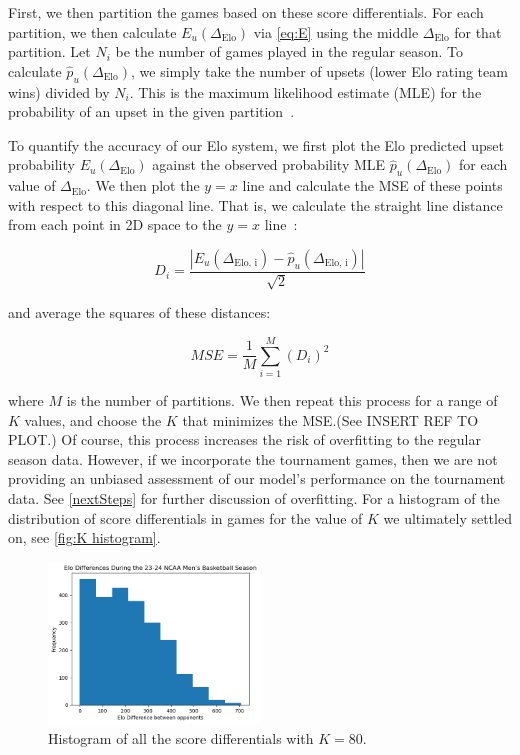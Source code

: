 \documentclass{article}
\begin{document}
First, we then partition the games based on these score differentials. For each partition, we then calculate $E_u(\Delta_{\text{Elo}})$ via \autoref{eq:E} using the middle $\Delta_{\text{Elo}}$ for that partition. Let $N_i$ be the number of games played in the regular season. To calculate $\hat{p}_u(\Delta_{\text{Elo}})$, we simply take the number of upsets (lower Elo rating team wins) divided by $N_i$. This is the maximum likelihood estimate (MLE) for the probability of an upset in the given partition~\cite{statproofbookMaximumLikelihood}.




To quantify the accuracy of our Elo system, we first plot the Elo predicted upset probability $E_u(\Delta_{\text{Elo}})$ against the observed probability MLE $\hat{p}_u(\Delta_{\text{Elo}})$ for each value of $\Delta_{\text{Elo}}$. We then plot the $y=x$ line and calculate the MSE of these points with respect to this diagonal line. That is, we calculate the straight line distance from each point in 2D space to the $y=x$ line~\cite{enwiki:1235411332}:

\[
D_i = \frac{|E_u(\Delta_{\text{Elo, i}}) - \hat{p}_u(\Delta_{\text{Elo, i}})|}{\sqrt{2}}
\]

and average the squares of these distances:

\[
MSE = \frac{1}{M}\sum_{i=1}^M {(D_i)}^2
\]

where $M$ is the number of partitions. We then repeat this process for a range of $K$ values, and choose the $K$ that minimizes the MSE.\@ (See INSERT REF TO PLOT.) Of course, this process increases the risk of overfitting to the regular season data. However, if we incorporate the tournament games, then we are not providing an unbiased assessment of our model's performance on the tournament data. See \autoref{nextSteps} for further discussion of overfitting. For a histogram of the distribution of score differentials in games for the value of $K$ we ultimately settled on, see \autoref{fig:K histogram}.

\begin{figure}[!htb]
    \begin{center}
      \includegraphics[width=0.5\textwidth]{K histogram.png}
    \end{center}
    \caption{Histogram of all the score differentials with $K=80$.}\label{fig:K histogram}
\end{figure}
\end{document}
